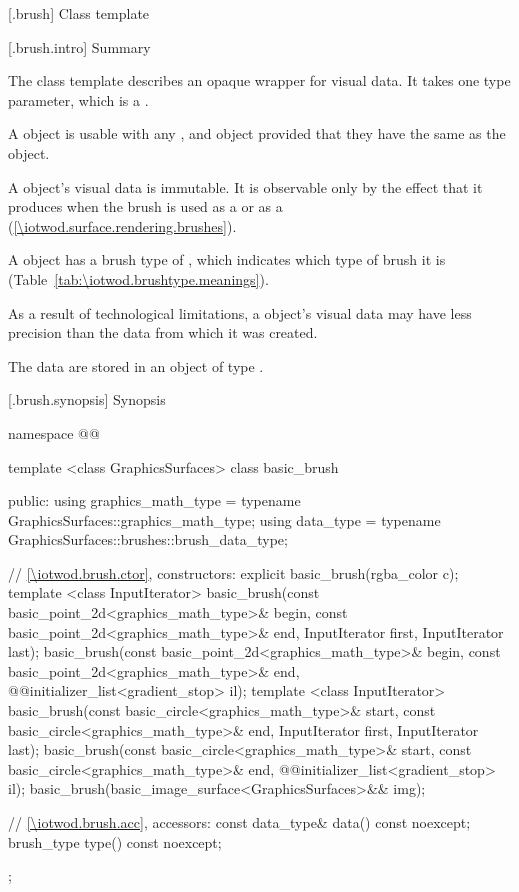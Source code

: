  [\iotwod.brush] {Class template }

 [\iotwod.brush.intro] {Summary}

\pnum
{}%
The class template  describes an opaque wrapper for visual data. It takes one type parameter, which is a \graphicssurfacestemplparamnospace.

\pnum
A  object is usable with any  , and  object provided that they have the same \graphicssurfacestemplparam as the  object.

\pnum
A  object's visual data is immutable. It is observable only by the effect that it produces when the brush is used as a  or as a  (\ref{\iotwod.surface.rendering.brushes}).

\pnum
A  object has a brush type of , which indicates which type of brush it is (Table~\ref{tab:\iotwod.brushtype.meanings}).

\pnum
As a result of technological limitations, a  object's visual data may have less precision than the data from which it was created.

\pnum
The data are stored in an object of type .

 [\iotwod.brush.synopsis] {Synopsis}

\begin{codeblock}
namespace @\fullnamespace{}@ {
  template <class GraphicsSurfaces>
  class basic_brush {
  public:
    using graphics_math_type = typename GraphicsSurfaces::graphics_math_type;
    using data_type = typename GraphicsSurfaces::brushes::brush_data_type;

    // \ref{\iotwod.brush.ctor}, constructors:
    explicit basic_brush(rgba_color c);
    template <class InputIterator>
    basic_brush(const basic_point_2d<graphics_math_type>& begin,
      const basic_point_2d<graphics_math_type>& end,
      InputIterator first, InputIterator last);
    basic_brush(const basic_point_2d<graphics_math_type>& begin,
      const basic_point_2d<graphics_math_type>& end,
      @\stdqualifier{}@initializer_list<gradient_stop> il);
    template <class InputIterator>
    basic_brush(const basic_circle<graphics_math_type>& start,
      const basic_circle<graphics_math_type>& end,
      InputIterator first, InputIterator last);
    basic_brush(const basic_circle<graphics_math_type>& start,
      const basic_circle<graphics_math_type>& end,
      @\stdqualifier{}@initializer_list<gradient_stop> il);
    basic_brush(basic_image_surface<GraphicsSurfaces>&& img);

	// \ref{\iotwod.brush.acc}, accessors:
    const data_type& data() const noexcept;
    brush_type type() const noexcept;
  };
}
\end{codeblock}

